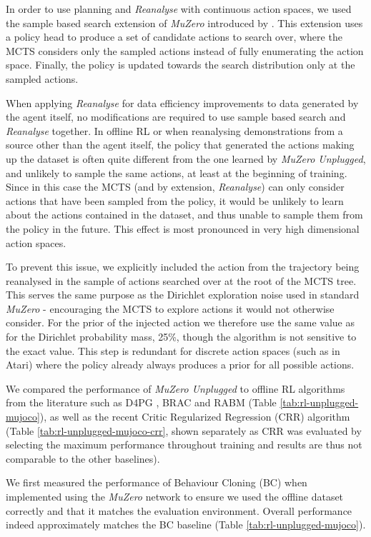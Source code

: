 \documentclass{article}
\newcommand{\muzero}{\emph{MuZero}}
\newcommand{\reanalyse}{\emph{Reanalyse}}
\newcommand{\mzunplugged}{\emph{MuZero Unplugged}}
\begin{document}
In order to use planning and \reanalyse{} with continuous action spaces, we used the sample based search extension of \muzero{} introduced by \cite{muzero_sampled}. This extension uses a policy head to produce a set of candidate actions to search over, where the MCTS considers only the sampled actions instead of fully enumerating the action space. Finally, the policy is updated towards the search distribution only at the sampled actions.

When applying \reanalyse{} for data efficiency improvements to data generated by the agent itself, no modifications are required to use sample based search and \reanalyse{} together. In offline RL or when reanalysing demonstrations from a source other than the agent itself, the policy that generated the actions making up the dataset is often quite different from the one learned by \mzunplugged{}, and unlikely to sample the same actions, at least at the beginning of training. Since in this case the MCTS (and by extension, \reanalyse{}) can only consider actions that have been sampled from the policy, it would be unlikely to learn about the actions contained in the dataset, and thus unable to sample them from the policy in the future. This effect is most pronounced in very high dimensional action spaces.

To prevent this issue, we explicitly included the action from the trajectory being reanalysed in the sample of actions searched over at the root of the MCTS tree. This serves the same purpose as the Dirichlet exploration noise used in standard \muzero{} - encouraging the MCTS to explore actions it would not otherwise consider. For the prior of the injected action we therefore use the same value as for the Dirichlet probability mass, 25\%, though the algorithm is not sensitive to the exact value. This step is redundant for discrete action spaces (such as in Atari) where the policy already always produces a prior for all possible actions.

We compared the performance of \mzunplugged{} to offline RL algorithms from the literature such as D4PG \cite{d4pg}, BRAC \cite{wu2019brac} and RABM \cite{siegel2020keep,rl_unplugged} (Table \ref{tab:rl-unplugged-mujoco}), as well as the recent Critic Regularized Regression (CRR) \cite{wang2020critic} algorithm (Table \ref{tab:rl-unplugged-mujoco-crr}, shown separately as CRR was evaluated by selecting the maximum performance throughout training and results are thus not comparable to the other baselines).

We first measured the performance of Behaviour Cloning (BC) when implemented using the \muzero{} network to ensure we used the offline dataset correctly and that it matches the evaluation environment. Overall performance indeed approximately matches the BC baseline (Table \ref{tab:rl-unplugged-mujoco}).
\end{document}
